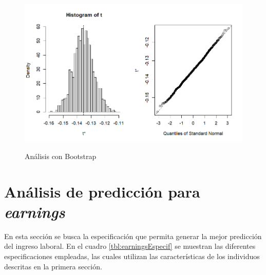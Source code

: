 \documentclass[11pt,a4paper]{article}
\begin{document}
\begin{figure}[H]
    \centering
    \caption{Análisis con Bootstrap}
    \includegraphics[width=\textwidth]{../views/boos_g.png}
    \label{fig:boosg}
\end{figure}

\section{Análisis de predicción para \emph{earnings}}

En esta sección se busca la especificación que permita generar la mejor predicción del ingreso laboral.
En el cuadro \ref{tbl:earningsEspecif} se muestran las diferentes especificaciones empleadas, las cuales utilizan las características de los individuos descritas en la primera sección.
\end{document}
